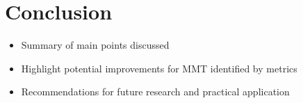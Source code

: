 \documentclass[sigplan, nonacm]{acmart}
\begin{document}
\section{Conclusion}
\begin{itemize}
	\item Summary of main points discussed
	\item Highlight potential improvements for MMT identified by metrics
	\item Recommendations for future research and practical application
\end{itemize}



\end{document}
